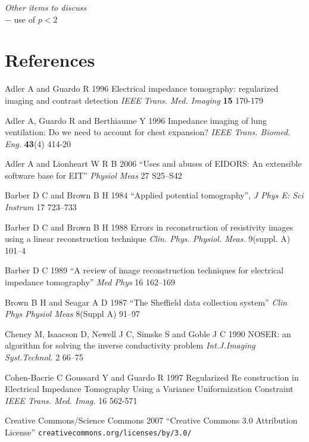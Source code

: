 \documentclass[12pt]{iopart}
\begin{document}
{\em Other items to discuss}
\\
$-$ use of $p<2$



\section*{References}

\References %
\item[]
Adler A and Guardo R 1996 Electrical impedance tomography:
regularized imaging and contrast detection {\em IEEE Trans. Med.
Imaging} {\bf 15} 170-179

\item[]
Adler A, Guardo R and Berthiaume Y 1996 Impedance imaging of lung
ventilation: Do we need to account for chest expansion? {\em IEEE
Trans. Biomed. Eng.} {\bf 43}(4) 414-20


\item[]
Adler A and Lionheart W R B 2006
``Uses and abuses of EIDORS: An extensible software base for EIT''
{\em Physiol Meas}
27 S25--S42

\item[]
Barber D C and Brown B H 1984
``Applied potential tomography'', 
{\em J Phys E: Sci Instrum}
 17 723--733

\item[]
Barber D C and Brown B H 1988 Errors in reconstruction of
resistivity images using a linear reconstruction technique {\em
Clin. Phys. Physiol. Meas.} 
9(suppl. A) 101--4

\item[]
Barber D C 1989
``A review of image reconstruction techniques for electrical
 impedance tomography''
{\em Med Phys}
16 162--169

\item[]
Brown B H and Seagar A D 1987 
``The Sheffield data collection system''
{\em Clin Phys Physiol Meas}
 8(Suppl A) 91--97

\item[]
Cheney M, Isaacson D, Newell J C, Simske S and Goble J C 1990
NOSER: an algorithm for solving the inverse conductivity problem
{\em Int.J.Imaging Syst.Technol.} 
2 66--75

\item[]
Cohen-Bacrie C  Goussard Y and Guardo R
1997
Regularized Re construction in Electrical
Impedance Tomography Using a Variance
Uniformization Constraint 
{\em IEEE Trans. Med. Imag.} 16 562-571

\item[]
Creative Commons/Science Commons 2007
``Creative Commons 3.0 Attribution License''
\verb+creativecommons.org/licenses/by/3.0/+
\end{document}
